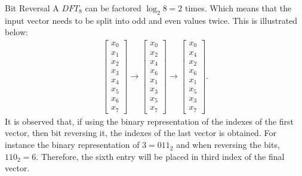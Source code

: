 \begin{example}{Bit Reversal}
    A $DFT_8$ can be factored $\log_2 8 = 2$ times. Which means that the input vector needs to be split into odd and even values twice. This is illustrated below:
    \begin{align*}
        \begin{bmatrix}
            x_0 \\
            x_1 \\
            x_2 \\
            x_3 \\
            x_4 \\
            x_5 \\
            x_6 \\
            x_7
        \end{bmatrix}
        \rightarrow
        \begin{bmatrix}
            x_0 \\
            x_2 \\
            x_4 \\
            x_6 \\
            x_1 \\
            x_3 \\
            x_5 \\
            x_7
        \end{bmatrix}
        \rightarrow
        \begin{bmatrix}
            x_0 \\
            x_4 \\
            x_2 \\
            x_6 \\
            x_1 \\
            x_5 \\
            x_3 \\
            x_7
        \end{bmatrix}.
    \end{align*}
    It is observed that, if using the binary representation of the indexes of the first vector, then bit reversing it, the indexes of the last vector is obtained. For instance the binary representation of $3=011_2$ and when reversing the bits, $110_2=6$. Therefore, the sixth entry will be placed in third index of the final vector.
    

\end{example}
